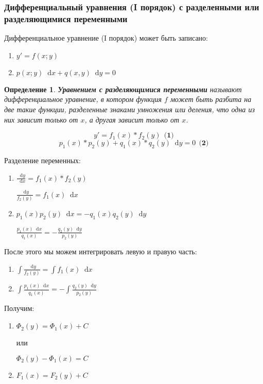 \documentclass{article}
\newcommand*\diff{\mathop{}\!\mathrm{d}}
\newtheorem{definition}{Определение}
\begin{document}
\subsubsection{Дифференциальный уравнения (I порядок) с разделенными или разделяющимися переменными}

Дифференциальное уравнение (I порядок) может быть записано:

\begin{enumerate}
    \item $y' = f(x; y)$
    \item $p(x; y) \diff x + q(x, y) \diff y = 0$
\end{enumerate}

\begin{definition}
    \textbf{Уравнением с разделяющимися переменными} называют дифференциальное уравнение, в котором функция $f$ может быть разбита на две такие функции, разделенные знаками умножения или деления, что одна из них зависит только от $x$, а другая зависит только от $x$.

    $$y' = f_1(x) * f_2(y) \ \ \textbf{(1)}$$
    $$p_1(x) * p_2(y) + q_1(x) * q_2(y) \diff y = 0 \ \ \textbf{(2)}$$
\end{definition}

Разделение переменных:

\begin{enumerate}
    \item $\frac{\diff y}{\diff x} = f_1(x) * f_2(y)$

    $\frac{\diff y}{f_2(y)} = f_1(x) \diff x$
    \item $p_1(x) p_2(y) \diff x = -q_1(x) q_2(y) \diff y$

    $\frac{p_1(x) \diff x}{q_1(x)} = -\frac{q_2(y) \diff y}{p_2(y)}$
\end{enumerate}

После этого мы можем интегрировать левую и правую часть:

\begin{enumerate}
    \item $\int \frac{\diff y}{f_2(y)} = \int f_1(x) \diff x$
    \item $\int \frac{p_1(x) \diff x}{q_1(x)} = -\int \frac{q_2(y) \diff y}{p_2(y)}$
\end{enumerate}

Получим:

\begin{enumerate}
    \item $\Phi_2(y) = \Phi_1(x) + C$

    или

    $\Phi_2(y) - \Phi_1(x) = C$
    \item $F_1(x) = F_2(y) + C$
\end{enumerate}
\end{document}
